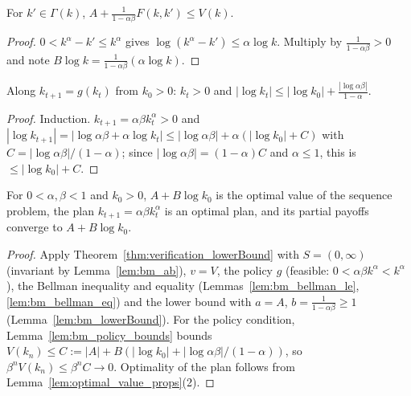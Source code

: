 \begin{lemma}
\label{lem:bm_lowerBound}
\leanok
{}
For $k' \in \Gamma(k)$, $A + \frac{1}{1-\alpha\beta} F(k, k') \le V(k)$.
\end{lemma}
\begin{proof}
\leanok
$0 < k^\alpha - k' \le k^\alpha$ gives $\log(k^\alpha - k') \le \alpha \log k$. Multiply by
$\frac{1}{1 - \alpha\beta} > 0$ and note $B \log k = \frac{1}{1-\alpha\beta}(\alpha\log k)$.
\end{proof}

\begin{lemma}
\label{lem:bm_policy_bounds}
\leanok
{}
Along $k_{t+1} = g(k_t)$ from $k_0 > 0$: $k_t > 0$ and $|\log k_t| \le |\log k_0| + \frac{|\log \alpha\beta|}{1-\alpha}$.
\end{lemma}
\begin{proof}
\leanok
Induction. $k_{t+1} = \alpha\beta k_t^\alpha > 0$ and
$|\log k_{t+1}| = |\log\alpha\beta + \alpha \log k_t| \le |\log\alpha\beta| + \alpha(|\log k_0| + C)$
with $C = |\log\alpha\beta|/(1-\alpha)$; since $|\log\alpha\beta| = (1-\alpha) C$ and $\alpha \le 1$, this is
$\le |\log k_0| + C$.
\end{proof}

\begin{theorem}
\label{thm:brockMirman_value}
\leanok
{}
For $0 < \alpha, \beta < 1$ and $k_0 > 0$, $A + B\log k_0$ is the optimal value of the sequence problem,
the plan $k_{t+1} = \alpha\beta k_t^\alpha$ is an optimal plan, and its partial payoffs converge to
$A + B \log k_0$.
\end{theorem}
\begin{proof}
\leanok
Apply Theorem~\ref{thm:verification_lowerBound} with $S = (0, \infty)$ (invariant by
Lemma~\ref{lem:bm_ab}), $v = V$, the policy $g$ (feasible: $0 < \alpha\beta k^\alpha < k^\alpha$), the
Bellman inequality and equality (Lemmas~\ref{lem:bm_bellman_le}, \ref{lem:bm_bellman_eq}) and the lower
bound with $a = A$, $b = \frac{1}{1-\alpha\beta} \ge 1$ (Lemma~\ref{lem:bm_lowerBound}). For the policy
condition, Lemma~\ref{lem:bm_policy_bounds} bounds $V(k_n) \le C := |A| + B(|\log k_0| + |\log\alpha\beta|/(1-\alpha))$,
so $\beta^n V(k_n) \le \beta^n C \to 0$. Optimality of the plan follows from Lemma~\ref{lem:optimal_value_props}(2).
\end{proof}


